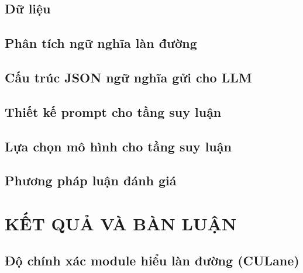 \documentclass[a4paper,12pt]{report}
\begin{document}
\section{Dữ liệu}

\section{Phân tích ngữ nghĩa làn đường}
%
%

\section{Cấu trúc JSON ngữ nghĩa gửi cho LLM}

\section{Thiết kế prompt cho tầng suy luận}

\section{Lựa chọn mô hình cho tầng suy luận}

\section{Phương pháp luận đánh giá}

\chapter{KẾT QUẢ VÀ BÀN LUẬN}

\section{Độ chính xác module hiểu làn đường (CULane)}
%
\end{document}
